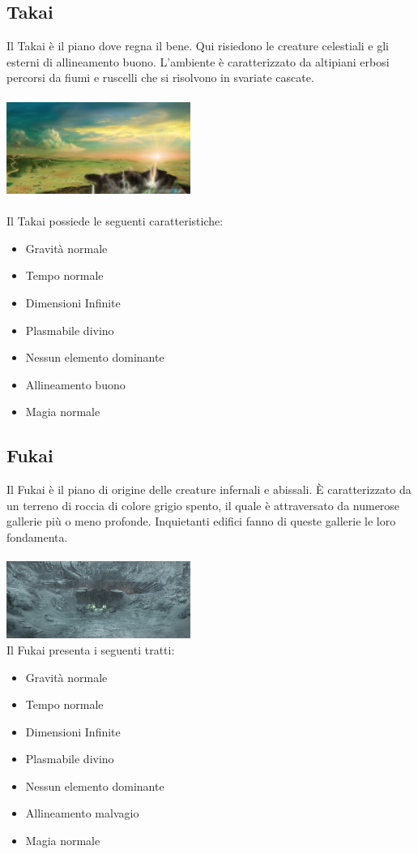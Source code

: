 \documentclass[10pt, a4paper]{report}
\begin{document}
\begin{multicols}{2}
\subsection*{Takai}
Il Takai è il piano dove regna il bene. Qui risiedono le creature celestiali e gli esterni di allineamento buono. L'ambiente è caratterizzato da altipiani erbosi percorsi da fiumi e ruscelli che si risolvono in svariate cascate.\\
\\
\includegraphics[width = 6cm]{takai.jpg}\\
\\
Il Takai possiede le seguenti caratteristiche:
\begin{itemize}
	\item Gravità normale
	\item Tempo normale
	\item Dimensioni Infinite
	\item Plasmabile divino
	\item Nessun elemento dominante
	\item Allineamento buono
	\item Magia normale
\end{itemize}

\subsection*{Fukai}
Il Fukai è il piano di origine delle creature infernali e abissali. È caratterizzato da un terreno di roccia di colore grigio spento, il quale è attraversato da numerose gallerie più o meno profonde. Inquietanti edifici fanno di queste gallerie le loro fondamenta.\\
\\
\includegraphics[width = 6cm]{fukai.jpeg}
\\
Il Fukai presenta i seguenti tratti:
\begin{itemize}
	\item Gravità normale
	\item Tempo normale
	\item Dimensioni Infinite
	\item Plasmabile divino
	\item Nessun elemento dominante
	\item Allineamento malvagio
	\item Magia normale
\end{itemize}

\end{multicols}
\end{document}
